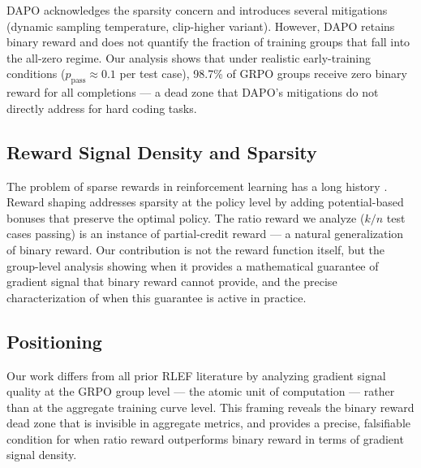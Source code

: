 DAPO \citep{yu2025dapo} acknowledges the sparsity concern and introduces several mitigations (dynamic sampling temperature, clip-higher variant). However, DAPO retains binary reward and does not quantify the fraction of training groups that fall into the all-zero regime. Our analysis shows that under realistic early-training conditions ($p_{\text{pass}} \approx 0.1$ per test case), 98.7\% of GRPO groups receive zero binary reward for all completions --- a dead zone that DAPO's mitigations do not directly address for hard coding tasks.

\subsection{Reward Signal Density and Sparsity}

The problem of sparse rewards in reinforcement learning has a long history \citep{sutton2018rl}. Reward shaping \citep{ng1999policy} addresses sparsity at the policy level by adding potential-based bonuses that preserve the optimal policy. The ratio reward we analyze ($k/n$ test cases passing) is an instance of partial-credit reward --- a natural generalization of binary reward. Our contribution is not the reward function itself, but the group-level analysis showing when it provides a mathematical guarantee of gradient signal that binary reward cannot provide, and the precise characterization of when this guarantee is active in practice.

\subsection{Positioning}

Our work differs from all prior RLEF literature by analyzing gradient signal quality at the GRPO group level --- the atomic unit of computation --- rather than at the aggregate training curve level. This framing reveals the binary reward dead zone that is invisible in aggregate metrics, and provides a precise, falsifiable condition for when ratio reward outperforms binary reward in terms of gradient signal density.
